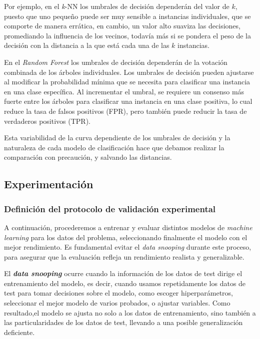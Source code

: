 \begin{itemize}
    Por ejemplo, en el \textit{k}-NN los umbrales de decisión dependerán del valor de $k$, puesto que uno pequeño puede ser muy sensible a instancias individuales, que se comporte de manera errática, en cambio, un valor alto suaviza las decisiones, promediando la influencia de los vecinos, todavía más si se pondera el peso de la decisión con la distancia a la que está cada una de las $k$ instancias.

    En el \textit{Random Forest} los umbrales de decisión dependerán de la votación combinada de los árboles individuales. Los umbrales de decisión pueden ajustarse al modificar la probabilidad mínima que se necesita para clasificar una instancia en una clase específica. Al incrementar el umbral, se requiere un consenso más fuerte entre los árboles para clasificar una instancia en una clase positiva, lo cual reduce la tasa de falsos positivos (FPR), pero también puede reducir la tasa de verdaderos positivos (TPR).

    Esta variabilidad de la curva dependiente de los umbrales de decisión y la naturaleza de cada modelo de clasificación hace que debamos realizar la comparación con precaución, y salvando las distancias.

\end{itemize}


\subsection{Experimentación}

\subsubsection{Definición del protocolo de validación experimental}

A continuación, procederemos a entrenar y evaluar distintos modelos de \textit{machine learning} para los datos del problema, seleccionando finalmente el modelo con el mejor rendimiento. Es fundamental evitar el \textit{data snooping} durante este proceso, para asegurar que la evaluación refleja un rendimiento realista y generalizable.

El \textit{\textbf{data snooping}} ocurre cuando la información de los datos de test dirige el entrenamiento del modelo, es decir, cuando usamos repetidamente los datos de test para tomar decisiones sobre el modelo, como escoger hiperparámetros, seleccionar el mejor modelo de varios probados, o ajustar variables. Como resultado,el modelo se ajusta no solo a los datos de entrenamiento, sino también a las particularidades de los datos de test, llevando a una posible generalización deficiente.

